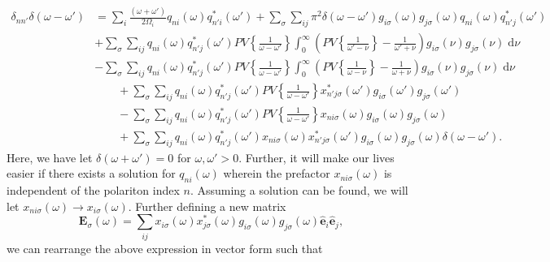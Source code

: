 \begin{equation}
\begin{split}
\delta_{nn'}\delta(\omega - \omega') &= \sum_i\frac{(\omega + \omega')}{2\Omega_i}q_{ni}(\omega)q_{n'i}^*(\omega') + \sum_\sigma\sum_{ij}\pi^2\delta(\omega - \omega')g_{i\sigma}(\omega)g_{j\sigma}(\omega)q_{ni}(\omega)q_{n'j}^*(\omega')\\
& + \sum_\sigma\sum_{ij}q_{ni}(\omega)q_{n'j}^*(\omega')PV\left\{\frac{1}{\omega - \omega'}\right\}\int_0^\infty\left(PV\left\{\frac{1}{\omega' - \nu }\right\} - \frac{1}{\omega' + \nu }\right)g_{i\sigma}(\nu)g_{j\sigma}(\nu)\;\mathrm{d}\nu\\
&- \sum_\sigma\sum_{ij}q_{ni}(\omega)q_{n'j}^*(\omega')PV\left\{\frac{1}{\omega - \omega'}\right\}\int_0^\infty\left(PV\left\{\frac{1}{\omega - \nu }\right\} - \frac{1}{\omega + \nu }\right)g_{i\sigma}(\nu)g_{j\sigma}(\nu)\;\mathrm{d}\nu\\
&\qquad + \sum_{\sigma}\sum_{ij}q_{ni}(\omega)q_{n'j}^*(\omega')PV\left\{\frac{1}{\omega - \omega'}\right\}x_{n'j\sigma}^*(\omega')g_{i\sigma}(\omega')g_{j\sigma}(\omega')\\
&\qquad - \sum_{\sigma}\sum_{ij}q_{ni}(\omega)q_{n'j}^*(\omega')PV\left\{\frac{1}{\omega - \omega'}\right\}x_{ni\sigma}(\omega)g_{i\sigma}(\omega)g_{j\sigma}(\omega)\\
&\qquad + \sum_\sigma\sum_{ij}q_{ni}(\omega)q_{n'j}^*(\omega')x_{ni\sigma}(\omega)x_{n'j\sigma}^*(\omega')g_{i\sigma}(\omega)g_{j\sigma}(\omega)\delta(\omega - \omega').
\end{split}
\end{equation}
Here, we have let $\delta(\omega + \omega') = 0$ for $\omega,\omega' > 0$. Further, it will make our lives easier if there exists a solution for $q_{ni}(\omega)$ wherein the prefactor $x_{ni\sigma}(\omega)$ is independent of the polariton index $n$. Assuming a solution can be found, we will let $x_{ni\sigma}(\omega)\to x_{i\sigma}(\omega)$. Further defining a new matrix
\begin{equation}
\mathbf{E}_\sigma(\omega) = \sum_{ij}x_{i\sigma}(\omega)x_{j\sigma}^*(\omega)g_{i\sigma}(\omega)g_{j\sigma}(\omega)\hat{\mathbf{e}}_i\hat{\mathbf{e}}_j,
\end{equation}
we can rearrange the above expression in vector form such that
